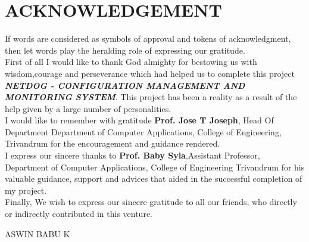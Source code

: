 \chapter*{\rm \large \bf ACKNOWLEDGEMENT}
\vspace{4.0mm}
\setlength{\parindent}{1cm} 


\indent If words are considered as symbols of approval and tokens of
acknowledgment, then let words play the heralding role of expressing our
gratitude.\\

\indent First of all I would like to thank God almighty for bestowing us with
wisdom,courage and perseverance which had helped us to complete this
project \textbf{\textit{NETDOG - CONFIGURATION MANAGEMENT AND MONITORING SYSTEM}}.
This project has been a reality as a result of the help given by a large
number of personalities.\\

\indent I would like to remember with gratitude \textbf{Prof. Jose T Joseph},
Head Of Department Department of Computer Applications, College of Engineering,
Trivandrum for the encouragement and guidance rendered.\\

\indent I express our sincere thanks to \textbf{Prof. Baby Syla},Assistant
Professor, Department of Computer Applications, College of Engineering
Trivandrum for his valuable guidance, support and advices that aided in the
successful completion of my project.\\

\indent Finally, We wish to express our sincere gratitude to all our friends,
who directly or indirectly contributed in this venture. \\




\begin{flushright}
ASWIN BABU K\\
\end{flushright}
\newpage
